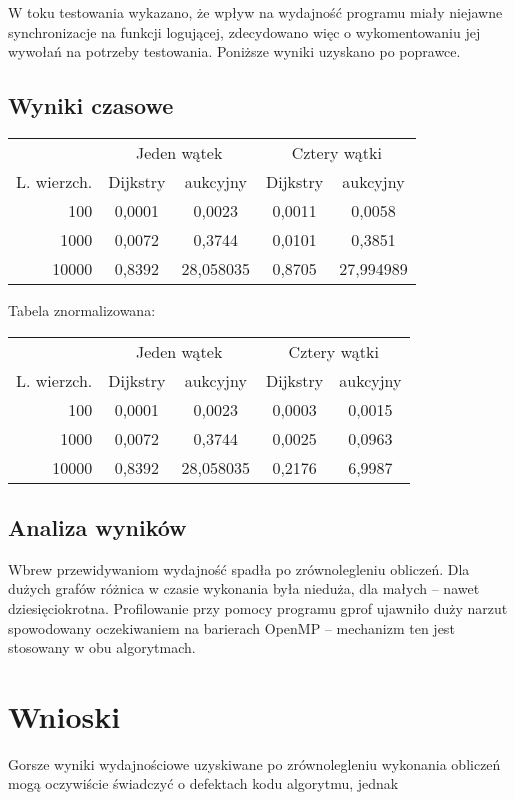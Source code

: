 \documentclass {article}
\begin{document}
W toku testowania wykazano, że wpływ na wydajność programu miały niejawne synchronizacje na funkcji logującej, zdecydowano więc o wykomentowaniu jej wywołań na potrzeby testowania. Poniższe wyniki uzyskano po poprawce.

\subsection{Wyniki czasowe}


\begin{tabular}{r|cc|cc}
 & \multicolumn{2}{c}{Jeden wątek}  & \multicolumn{2}{c}{Cztery wątki} \\
L. wierzch. & Dijkstry & aukcyjny & Dijkstry & aukcyjny \\
\hline
100   & 0,0001 & 0,0023 & 0,0011 & 0,0058 \\
1000  & 0,0072 & 0,3744 & 0,0101 & 0,3851 \\
10000 & 0,8392 & 28,058035 & 0,8705 & 27,994989  
\end{tabular}

Tabela znormalizowana:

\begin{tabular}{r|cc|cc}
 & \multicolumn{2}{c}{Jeden wątek}  & \multicolumn{2}{c}{Cztery wątki} \\
L. wierzch. & Dijkstry & aukcyjny & Dijkstry & aukcyjny \\
\hline
100   & 0,0001 & 0,0023 & 0,0003 & 0,0015 \\
1000  & 0,0072 & 0,3744 & 0,0025 & 0,0963 \\
10000 & 0,8392 & 28,058035 & 0,2176 & 6,9987
\end{tabular}

\subsection{Analiza wyników}

Wbrew przewidywaniom wydajność spadła po zrównolegleniu obliczeń. Dla dużych grafów różnica w czasie wykonania była nieduża, dla małych -- nawet dziesięciokrotna. Profilowanie przy pomocy programu gprof ujawniło duży narzut spowodowany oczekiwaniem na barierach OpenMP -- mechanizm ten jest stosowany w obu algorytmach.

\section{Wnioski}

Gorsze wyniki wydajnościowe uzyskiwane po zrównolegleniu wykonania obliczeń mogą oczywiście świadczyć o defektach kodu algorytmu, jednak 
\end{document}
